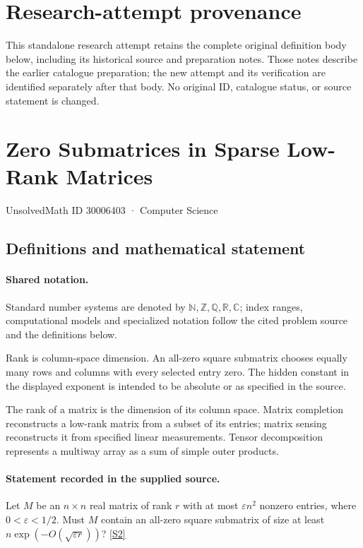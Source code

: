 \documentclass[11pt]{article}
\begin{document}
\section*{Research-attempt provenance}
This standalone research attempt retains the complete original definition body below,
including its historical source and preparation notes. Those notes describe the
earlier catalogue preparation; the new attempt and its verification are identified
separately after that body. No original ID, catalogue status, or source statement is changed.

\section{Zero Submatrices in Sparse Low-Rank Matrices}\label{30006403}
{\small UnsolvedMath ID 30006403 · Computer Science}
\subsection{Definitions and mathematical statement}

\paragraph{Shared notation.}Standard number systems are denoted by $\mathbb N,\mathbb Z,\mathbb Q,\mathbb R,\mathbb C$; index ranges, computational models and specialized notation follow the cited problem source and the definitions below.


Rank is column-space dimension. An all-zero square submatrix chooses equally many rows and columns with every selected entry zero. The hidden constant in the displayed exponent is intended to be absolute or as specified in the source.

The rank of a matrix is the dimension of its column space. Matrix completion reconstructs a low-rank matrix from a subset of its entries; matrix sensing reconstructs it from specified linear measurements. Tensor decomposition represents a multiway array as a sum of simple outer products.
\paragraph{Statement recorded in the supplied source.}
Let $M$ be an $n\times n$ real matrix of rank $r$ with at most $\varepsilon n^2$ nonzero entries, where $0<\varepsilon<1/2$. Must $M$ contain an all-zero square submatrix of size at least $n\exp\!\left(-O(\sqrt{\varepsilon r})\right)$? \href{https://doi.org/10.4171/owr/2025/42}{[S2]}
\end{document}
